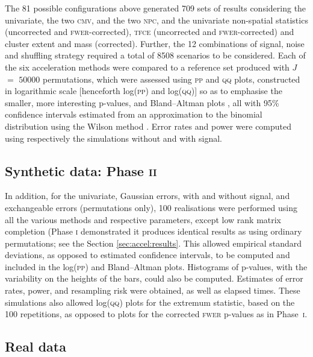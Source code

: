 The 81 possible configurations above generated 709 sets of results considering the univariate, the two \textsc{cmv}, and the two \textsc{npc}, and the univariate non-spatial statistics (uncorrected and \textsc{fwer}-corrected), \textsc{tfce} (uncorrected and \textsc{fwer}-corrected) and cluster extent and mass (corrected). Further, the 12 combinations of signal, noise and shuffling strategy required a total of 8508 scenarios to be considered. Each of the six acceleration methods were compared to a reference set produced with $J$ $=$ $50000$ permutations, which were assessed using \textsc{pp} and \textsc{qq} plots, constructed in logarithmic scale [henceforth log(\textsc{pp}) and log(\textsc{qq})] so as to emphasise the smaller, more interesting p-values, and Bland--Altman plots \citep{Bland1986}, all with 95\% confidence intervals estimated from an approximation to the binomial distribution using the Wilson method \citep{Wilson1927}. Error rates and power were computed using respectively the simulations without and with signal.

\subsection{Synthetic data: Phase \textsc{ii}}

In addition, for the univariate, Gaussian errors, with and without signal, and exchangeable errors (permutations only), 100 realisations were performed using all the various methods and respective parameters, except low rank matrix completion (Phase \textsc{i} demonstrated it produces identical results as using ordinary permutations; see the Section \ref{sec:accel:results}. This allowed empirical standard deviations, as opposed to estimated confidence intervals, to be computed and included in the log(\textsc{pp}) and Bland--Altman plots. Histograms of p-values, with the variability on the heights of the bars, could also be computed. Estimates of error rates, power, and resampling risk were obtained, as well as elapsed times. These simulations also allowed log(\textsc{qq}) plots for the extremum statistic, based on the 100 repetitions, as opposed to plots for the corrected \textsc{fwer} p-values as in Phase~\textsc{i}.

\subsection{Real data}

